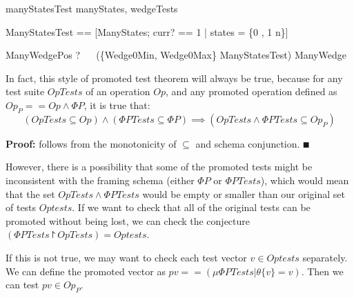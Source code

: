 \documentclass{llncs}
\begin{document}
\begin{zsection}
  \SECTION manyStatesTest \parents manyStates, wedgeTests
\end{zsection}

\begin{zed}
  \Phi ManyStatesTest ==
    [\Phi ManyStates; curr? == 1 | states = \{0 , 1 \mapsto n\}]
\end{zed}

\begin{theorem}{ManyWedgePos}
  \vdash? ~~ (\{Wedge0Min, Wedge0Max\} \land \Phi ManyStatesTest)
      \subseteq ManyWedge
\end{theorem}

In fact, this style of promoted test theorem will always be true,
because for any test suite $OpTests$ of an operation $Op$,
and any promoted operation defined as $Op_P == Op \land \Phi P$,
it is true that:
\[
   (OpTests \subseteq Op) \land (\Phi PTests \subseteq \Phi P)
   \implies (OpTests \land \Phi PTests \subseteq Op_P)
\]

\textbf{Proof:} follows from the monotonicity of $\subseteq$ and schema
conjunction. $\QED$

However, there is a possibility that some of the promoted tests
might be inconsistent with the framing schema (either $\Phi P$ or $\Phi
PTests$), which would mean that the set $OpTests \land \Phi PTests$
would be empty or smaller than our original set of tests $Optests$.
If we want to check that all of the original tests can be promoted without
being lost, we can check the conjecture
$(\Phi PTests \project OpTests) = Optests$.

If this is not true, we may want to check each test vector $v \in Optests$
separately.  We can define the promoted vector as 
$pv == (\mu \Phi PTests | \theta \{v\} = v)$.
Then we can test $pv \in Op_P$. 
\end{document}
